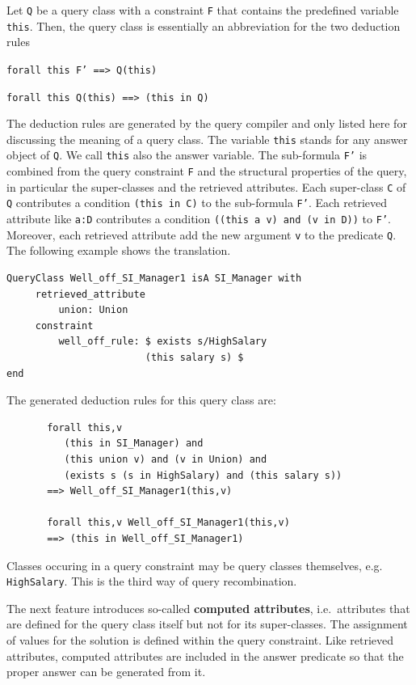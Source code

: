 Let {\tt Q} be a query class with a constraint {\tt F} that contains the predefined
variable {\tt this}. Then, the query class is essentially an abbreviation for the two deduction rules

        {\tt forall this  F' ==> Q(this)}

        {\tt forall this  Q(this) ==> (this in Q)}

The deduction rules are generated by the query compiler and only listed here for
discussing the meaning of a query class.
The variable {\tt this} stands for any answer object of {\tt Q}. We call {\tt this}
also the answer variable.  The sub-formula {\tt F'} is combined from the query 
constraint {\tt F} and the structural properties of the query, in particular the super-classes
and the retrieved attributes. Each super-class {\tt C} of {\tt Q} contributes a 
condition {\tt (this in C)} to the sub-formula {\tt F'}. Each retrieved attribute
like {\tt a:D} contributes a condition {\tt ((this a v) and (v in D))}
to {\tt F'}. Moreover, each retrieved attribute add the new argument {\tt v} to the predicate
{\tt Q}.
The following example shows the translation.

{\small
\begin{verbatim}
QueryClass Well_off_SI_Manager1 isA SI_Manager with
     retrieved_attribute
         union: Union
     constraint
         well_off_rule: $ exists s/HighSalary
                        (this salary s) $
end
\end{verbatim}
}

The generated deduction rules for this query class are:

{\small
\begin{verbatim}
       forall this,v
          (this in SI_Manager) and
          (this union v) and (v in Union) and
          (exists s (s in HighSalary) and (this salary s))
       ==> Well_off_SI_Manager1(this,v)

       forall this,v Well_off_SI_Manager1(this,v) 
       ==> (this in Well_off_SI_Manager1)
\end{verbatim}
}


Classes occuring in a query constraint may be query classes themselves, e.g. {\tt HighSalary}.
This is the third way of query recombination. 

The next feature introduces so-called {\bf computed attributes}, i.e.\ 
attributes that are defined for the query class itself but
not for its super-classes. The assignment of values for the solution is
defined within the query constraint. 
Like retrieved attributes, computed attributes are included in the answer predicate
so that the proper answer can be generated from it.

